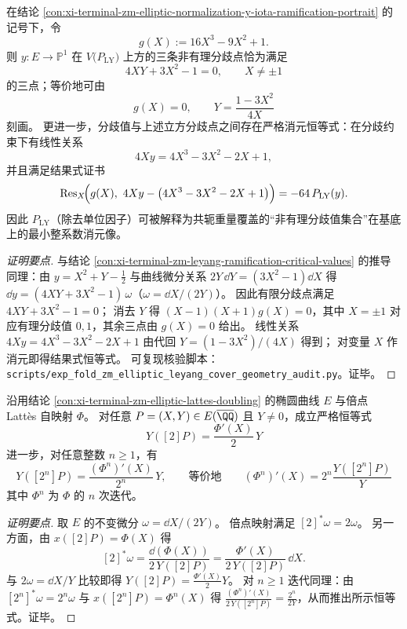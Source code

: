 \begin{conclusion}\label{con:xi-terminal-zm-leyang-branch-elimination-origin-y-iota}
在结论 \ref{con:xi-terminal-zm-elliptic-normalization-y-iota-ramification-portrait} 的记号下，令
\[
g(X):=16X^{3}-9X^{2}+1.
\]
则 \(y:E\to\mathbb P^{1}\) 在 \(V\!\bigl(P_{\mathrm{LY}}\bigr)\) 上方的三条非有理分歧点恰为满足
\[
4XY+3X^{2}-1=0,\qquad X\neq \pm 1
\]
的三点；等价地可由
\[
g(X)=0,\qquad Y=\frac{1-3X^{2}}{4X}
\]
刻画。
更进一步，分歧值与上述立方分歧点之间存在严格消元恒等式：在分歧约束下有线性关系
\[
4Xy=4X^{3}-3X^{2}-2X+1,
\]
并且满足结果式证书
\[
\mathrm{Res}_{X}\!\Bigl(g(X),\ 4Xy-\bigl(4X^{3}-3X^{2}-2X+1\bigr)\Bigr)=-64\,P_{\mathrm{LY}}(y).
\]
因此 \(P_{\mathrm{LY}}\)（除去单位因子）可被解释为共轭重量覆盖的“非有理分歧值集合”在基底上的最小整系数消元像。
\end{conclusion}
\begin{proof}[证明要点]
与结论 \ref{con:xi-terminal-zm-leyang-ramification-critical-values} 的推导同理：由
\(
y=X^{2}+Y-\tfrac12
\)
与曲线微分关系 \(2Y\,\dd Y=(3X^{2}-1)\dd X\) 得
\(
\dd y=(4XY+3X^{2}-1)\,\omega
\)（\(\omega=\dd X/(2Y)\)）。
因此有限分歧点满足 \(4XY+3X^{2}-1=0\)；
消去 \(Y\) 得
\(
(X-1)(X+1)g(X)=0
\)，其中 \(X=\pm 1\) 对应有理分歧值 \(0,1\)，其余三点由 \(g(X)=0\) 给出。
线性关系 \(4Xy=4X^{3}-3X^{2}-2X+1\) 由代回 \(Y=(1-3X^{2})/(4X)\) 得到；
对变量 \(X\) 作消元即得结果式恒等式。
可复现核验脚本：\texttt{scripts/exp\_fold\_zm\_elliptic\_leyang\_cover\_geometry\_audit.py}。证毕。
\end{proof}

\begin{conclusion}\label{con:xi-terminal-zm-elliptic-y-doubling-jacobian-cocycle}
沿用结论 \ref{con:xi-terminal-zm-elliptic-lattes-doubling} 的椭圆曲线 \(E\) 与倍点 Latt\`es 自映射 \(\Phi\)。
对任意 \(P=(X,Y)\in E(\overline{\QQ})\) 且 \(Y\neq 0\)，成立严格恒等式
\[
\boxed{\;
Y([2]P)=\frac{\Phi'(X)}{2}\,Y\;}
\]
进一步，对任意整数 \(n\ge 1\)，有
\[
\boxed{\;
Y([2^{n}]P)=\frac{(\Phi^{n})'(X)}{2^{n}}\,Y,
\qquad\text{等价地}\qquad
(\Phi^{n})'(X)=2^{n}\frac{Y([2^{n}]P)}{Y}\;}
\]
其中 \(\Phi^{n}\) 为 \(\Phi\) 的 \(n\) 次迭代。
\end{conclusion}
\begin{proof}[证明要点]
取 \(E\) 的不变微分 \(\omega=\dd X/(2Y)\)。
倍点映射满足 \([2]^{\ast}\omega=2\omega\)。
另一方面，由 \(x([2]P)=\Phi(X)\) 得
\[
[2]^{\ast}\omega=\frac{\dd(\Phi(X))}{2\,Y([2]P)}
=\frac{\Phi'(X)}{2\,Y([2]P)}\,\dd X.
\]
与 \(2\omega=\dd X/Y\) 比较即得 \(Y([2]P)=\frac{\Phi'(X)}{2}Y\)。
对 \(n\ge 1\) 迭代同理：由 \([2^{n}]^{\ast}\omega=2^{n}\omega\) 与 \(x([2^{n}]P)=\Phi^{n}(X)\) 得
\(
\frac{(\Phi^{n})'(X)}{2\,Y([2^{n}]P)}=\frac{2^{n}}{2Y}
\)，从而推出所示恒等式。证毕。
\end{proof}

